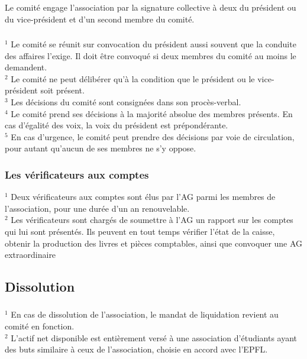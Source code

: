 \documentclass[12pt,a4paper,oneside]{article}
\newcounter{art}
\newcommand{\french}{    \switchcolumn[1]\noindent}
\newcounter{para}
\begin{document}
\begin{paracol}{2}

\french
	\subsubsection{}
	Le comité engage l’association par la signature collective à deux du président ou du vice-président et d’un second membre du comité. 

\french
	\subsubsection{}
	$^1$ Le comité se réunit sur convocation du président aussi souvent que la conduite des affaires l’exige. Il doit être convoqué si deux membres du comité au moins le demandent. \\
	$^2$ Le comité ne peut délibérer qu’à la condition que le président ou le vice-président soit présent.\\
	$^3$ Les décisions du comité sont consignées dans son procès-verbal.\\
	$^4$ Le comité prend ses décisions à la majorité absolue des membres présents. En cas d’égalité des voix, la voix du président est prépondérante.\\
	$^5$ En cas d’urgence, le comité peut prendre des décisions par voie de circulation, pour autant qu’aucun de ses membres ne s’y oppose.


\french
	\subsubsection{Les vérificateurs aux comptes}
	$^1$ Deux vérificateurs aux comptes sont élus par l’AG parmi les membres de l’association, pour une durée d’un an renouvelable.\\
	$^2$ Les vérificateurs sont chargés de soumettre à l’AG un rapport sur les comptes qui lui sont présentés. Ils peuvent en tout temps vérifier l’état de la caisse, obtenir la production des livres et pièces comptables, ainsi que convoquer une AG extraordinaire


\french
	\subsection{Dissolution}

	\subsubsection{}
	$^1$ En cas de dissolution de l’association, le mandat de liquidation revient au comité en fonction. \\
	$^2$ L'actif net disponible est entièrement versé à une association d’étudiants ayant des buts similaire à ceux de l’association, choisie en accord avec l’EPFL.



\end{paracol}
\end{document}

